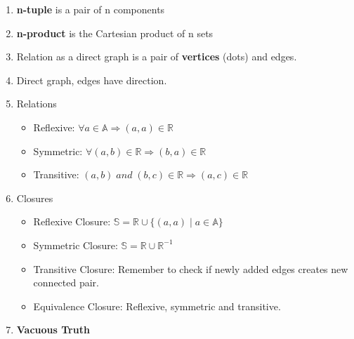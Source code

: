\documentclass[]{article}
\begin{document}
\begin{multicols}{2}
\begin{enumerate}
  \item \textbf{n-tuple} is a pair of n components 
  \item \textbf{n-product} is the Cartesian product of n sets
  \item Relation as a direct graph is a pair of \textbf{vertices} (dots) and edges.
  \item Direct graph, edges have direction. 
  \item Relations
    \begin{itemize}
      \item Reflexive: $ \forall a \in \mathbb{A} \Rightarrow (a, a) \in \mathbb{R} $
      \item Symmetric: $ \forall (a, b) \in \mathbb{R} \Rightarrow (b, a) \in \mathbb{R} $
      \item Transitive: $ (a, b) \; and \; (b, c) \in \mathbb{R} \Rightarrow (a, c) \in \mathbb{R} $
    \end{itemize}
  \item Closures
    \begin{itemize}
        \item Reflexive Closure: $ \mathbb{S} = \mathbb{R} \cup \{(a, a)\; |\; a \in \mathbb{A} \} $
        \item Symmetric Closure: $ \mathbb{S} = \mathbb{R} \cup \mathbb{R}^{-1} $ 
        \item Transitive Closure: Remember to check if newly added edges creates new connected pair.
        \item Equivalence Closure: Reflexive, symmetric and transitive.
    \end{itemize}
  \item \textbf{Vacuous Truth}
\end{enumerate} 

\end{multicols}
\end{document}

